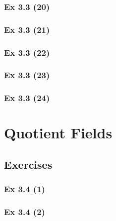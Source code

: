 \subsubsection{Ex 3.3 (20)}\label{sec:Ex_3.3.20}

\newpage		%

\subsubsection{Ex 3.3 (21)}\label{sec:Ex_3.3.21}

\subsubsection{Ex 3.3 (22)}\label{sec:Ex_3.3.22}

\subsubsection{Ex 3.3 (23)}\label{sec:Ex_3.3.23}

\subsubsection{Ex 3.3 (24)}\label{sec:Ex_3.3.24}

\newpage		%

\section{Quotient Fields}\label{sec:3.4}
\subsection{Exercises}\label{sec:3.4_Exercises}

\subsubsection{Ex 3.4 (1)}\label{sec:Ex_3.4.1}

\subsubsection{Ex 3.4 (2)}\label{sec:Ex_3.4.2}




